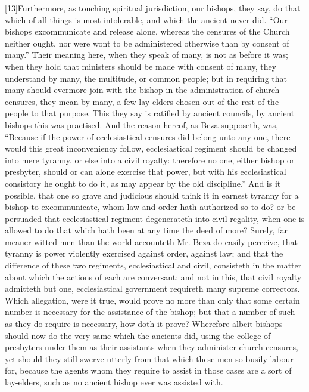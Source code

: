 [13]Furthermore, as touching spiritual jurisdiction, our bishops, they say, do that which of all things is most intolerable, and which the ancient never did. “Our bishops excommunicate and release alone, whereas the censures of the Church neither ought, nor were wont to be administered otherwise than by consent of many.” Their meaning here, when they speak of many, is not as before it was; when they hold that ministers should be made with consent of many, they understand by many, the multitude, or common people; but in requiring that many should evermore join with the bishop in the administration of church censures, they mean by many, a few lay-elders chosen out of the rest of the people to that purpose. This they say is ratified by ancient councils, by ancient bishops this was practised.  And the reason hereof, as Beza supposeth, was, “Because if the power of ecclesiastical censures did belong unto any one, there would this great inconveniency follow, ecclesiastical  regiment should be changed into mere tyranny, or else into a civil royalty: therefore no one, either bishop or presbyter, should or can alone exercise that power, but with his ecclesiastical consistory he ought to do it, as may appear by the old discipline.” And is it possible, that one so grave and judicious should think it in earnest tyranny for a bishop to excommunicate, whom law and order hath authorized so to do? or be persuaded that ecclesiastical regiment degenerateth into civil regality, when one is allowed to do that which hath been at any time the deed of more? Surely, far meaner witted men than the world accounteth Mr. Beza do easily perceive, that tyranny is power violently exercised against order, against law; and that the difference of these two regiments, ecclesiastical and civil, consisteth in the matter about which the actions of each are conversant; and not in this, that civil royalty admitteth but one, ecclesiastical government requireth many supreme correctors. Which allegation, were it true, would prove no more than only that some certain number is necessary for the assistance of the bishop; but that a number of such as they do require is necessary, how doth it prove? Wherefore albeit bishops should now do the very same which the ancients did, using the college of presbyters under them as their assistants when they administer church-censures, yet should they still swerve utterly from that which these men so busily labour for, because the agents whom they require to assist in those cases are a sort of lay-elders, such as no ancient bishop ever was assisted with.

